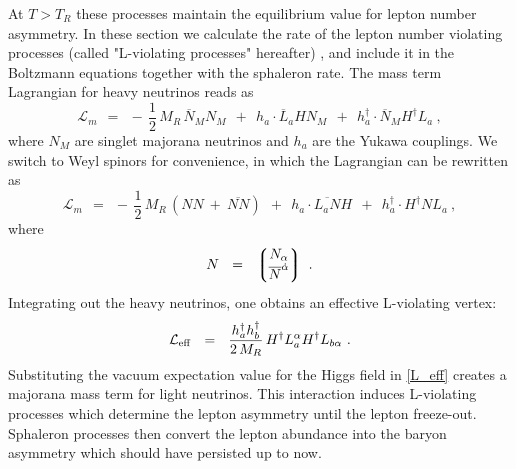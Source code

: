 \documentclass[12pt]{revtex4}
\newcommand{\ov}{\overline}
\begin{document}
	At $ T > T_R $ these processes maintain the equilibrium value for 
	lepton number asymmetry. 
	In these section we calculate the rate of the lepton number violating processes 
(called "L-violating processes"
hereafter) , and include it
	in the Boltzmann equations together with the sphaleron rate.
The mass term Lagrangian for heavy neutrinos reads as
\begin{equation}
	\mathcal{L}_m  ~~=~~ -\,\frac 12\, M_R\, \ov{N}{}_MN_M ~~+~~
				h_a\cdot \ov{L}_aHN_M ~~+~~  
				h_a^\dagger\cdot \ov{N}{}_MH^\dagger L_a~,
\end{equation}
	where $ N_M $ are singlet majorana neutrinos and $ h_a $ are the Yukawa couplings.
	We switch to Weyl spinors for convenience, in which the Lagrangian can be rewritten as
\begin{equation}
	\mathcal{L}_m  ~~=~~ 
	-\,\frac 12\, M_R\, \left( NN ~+~ \ov{N N} \right) ~~+~~
				h_a\cdot \ov{L_a N}H ~~+~~  
				h_a^\dagger\cdot H^\dagger N L_a~,
\end{equation}
	where
\[	
	N  ~~=~~ \left\lgroup 
		\begin{matrix}
			N_\alpha \\
			\ov{N}^{\dot{\alpha}}
		\end{matrix}
		\right\rgroup~.
\]
	Integrating out the heavy neutrinos, one obtains an effective L-violating vertex:
\begin{equation}
\label{L_eff}
	\mathcal{L}_{\rm eff} ~~=~~ \frac{h_a^\dag h_b^\dag}{2\, M_R} \, H^\dag L_a^\alpha H^\dag L_{b\alpha}~.
\end{equation}
	Substituting the vacuum expectation value 
for the Higgs field in \eqref{L_eff}
	creates a majorana mass term for light neutrinos. This interaction induces 
L-violating processes which determine the lepton asymmetry
	until the lepton freeze-out. 
	Sphaleron processes then convert the lepton abundance into the baryon asymmetry which
	should have persisted up to now. 

\end{document}
